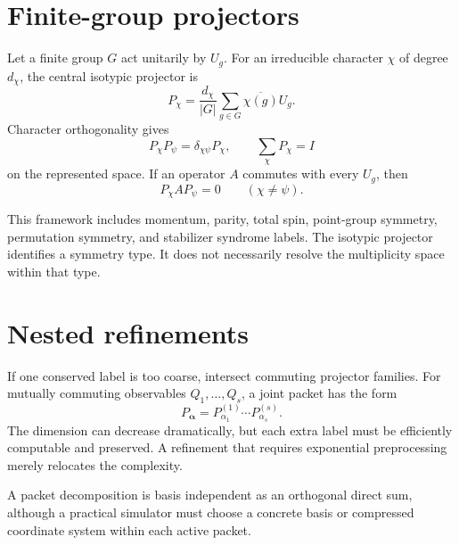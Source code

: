 \section{Finite-group projectors}
Let a finite group $G$ act unitarily by $U_g$. For an irreducible character $\chi$ of degree $d_\chi$, the central isotypic projector is
\begin{equation}
P_\chi
=
\frac{d_\chi}{|G|}
\sum_{g\in G}
\overline{\chi(g)}U_g.
\label{eq:character-projector}
\end{equation}
Character orthogonality gives
\[
P_\chi P_\psi=\delta_{\chi\psi}P_\chi,
\qquad
\sum_\chi P_\chi=I
\]
on the represented space. If an operator $A$ commutes with every $U_g$, then
\[
P_\chi A P_\psi=0
\qquad(\chi\neq\psi).
\]

This framework includes momentum, parity, total spin, point-group symmetry, permutation symmetry, and stabilizer syndrome labels. The isotypic projector identifies a symmetry type. It does not necessarily resolve the multiplicity space within that type.

\section{Nested refinements}
If one conserved label is too coarse, intersect commuting projector families. For mutually commuting observables $Q_1,\ldots,Q_s$, a joint packet has the form
\[
P_{\bm\alpha}
=
P^{(1)}_{\alpha_1}\cdots P^{(s)}_{\alpha_s}.
\]
The dimension can decrease dramatically, but each extra label must be efficiently computable and preserved. A refinement that requires exponential preprocessing merely relocates the complexity.

\begin{remark}
A packet decomposition is basis independent as an orthogonal direct sum, although a practical simulator must choose a concrete basis or compressed coordinate system within each active packet.
\end{remark}
